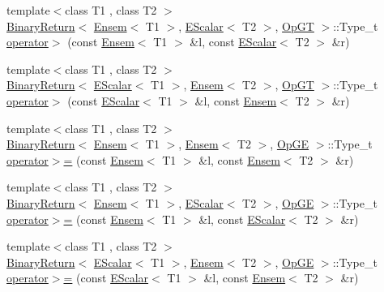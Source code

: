 \begin{DoxyCompactItemize}
\item 
{\footnotesize template$<$class T1 , class T2 $>$ }\\\mbox{\hyperlink{structENSEM_1_1BinaryReturn}{Binary\+Return}}$<$ \mbox{\hyperlink{classENSEM_1_1Ensem}{Ensem}}$<$ T1 $>$, \mbox{\hyperlink{classENSEM_1_1EScalar}{E\+Scalar}}$<$ T2 $>$, \mbox{\hyperlink{structENSEM_1_1OpGT}{Op\+GT}} $>$\+::Type\+\_\+t \mbox{\hyperlink{group__eensem_gadb5372b36c1e21728de4e36358b59440}{operator$>$}} (const \mbox{\hyperlink{classENSEM_1_1Ensem}{Ensem}}$<$ T1 $>$ \&l, const \mbox{\hyperlink{classENSEM_1_1EScalar}{E\+Scalar}}$<$ T2 $>$ \&r)
\item 
{\footnotesize template$<$class T1 , class T2 $>$ }\\\mbox{\hyperlink{structENSEM_1_1BinaryReturn}{Binary\+Return}}$<$ \mbox{\hyperlink{classENSEM_1_1EScalar}{E\+Scalar}}$<$ T1 $>$, \mbox{\hyperlink{classENSEM_1_1Ensem}{Ensem}}$<$ T2 $>$, \mbox{\hyperlink{structENSEM_1_1OpGT}{Op\+GT}} $>$\+::Type\+\_\+t \mbox{\hyperlink{group__eensem_gaf81a55e62404e9b802fbb90aaee678ea}{operator$>$}} (const \mbox{\hyperlink{classENSEM_1_1EScalar}{E\+Scalar}}$<$ T1 $>$ \&l, const \mbox{\hyperlink{classENSEM_1_1Ensem}{Ensem}}$<$ T2 $>$ \&r)
\item 
{\footnotesize template$<$class T1 , class T2 $>$ }\\\mbox{\hyperlink{structENSEM_1_1BinaryReturn}{Binary\+Return}}$<$ \mbox{\hyperlink{classENSEM_1_1Ensem}{Ensem}}$<$ T1 $>$, \mbox{\hyperlink{classENSEM_1_1Ensem}{Ensem}}$<$ T2 $>$, \mbox{\hyperlink{structENSEM_1_1OpGE}{Op\+GE}} $>$\+::Type\+\_\+t \mbox{\hyperlink{group__eensem_gab4cf01cccb06cf4c911567c3ee6eb808}{operator$>$=}} (const \mbox{\hyperlink{classENSEM_1_1Ensem}{Ensem}}$<$ T1 $>$ \&l, const \mbox{\hyperlink{classENSEM_1_1Ensem}{Ensem}}$<$ T2 $>$ \&r)
\item 
{\footnotesize template$<$class T1 , class T2 $>$ }\\\mbox{\hyperlink{structENSEM_1_1BinaryReturn}{Binary\+Return}}$<$ \mbox{\hyperlink{classENSEM_1_1Ensem}{Ensem}}$<$ T1 $>$, \mbox{\hyperlink{classENSEM_1_1EScalar}{E\+Scalar}}$<$ T2 $>$, \mbox{\hyperlink{structENSEM_1_1OpGE}{Op\+GE}} $>$\+::Type\+\_\+t \mbox{\hyperlink{group__eensem_gaefcc523be9266958f63fc6b34c2671e8}{operator$>$=}} (const \mbox{\hyperlink{classENSEM_1_1Ensem}{Ensem}}$<$ T1 $>$ \&l, const \mbox{\hyperlink{classENSEM_1_1EScalar}{E\+Scalar}}$<$ T2 $>$ \&r)
\item 
{\footnotesize template$<$class T1 , class T2 $>$ }\\\mbox{\hyperlink{structENSEM_1_1BinaryReturn}{Binary\+Return}}$<$ \mbox{\hyperlink{classENSEM_1_1EScalar}{E\+Scalar}}$<$ T1 $>$, \mbox{\hyperlink{classENSEM_1_1Ensem}{Ensem}}$<$ T2 $>$, \mbox{\hyperlink{structENSEM_1_1OpGE}{Op\+GE}} $>$\+::Type\+\_\+t \mbox{\hyperlink{group__eensem_ga08b4c51fd25a40dd1d20e6138378a63d}{operator$>$=}} (const \mbox{\hyperlink{classENSEM_1_1EScalar}{E\+Scalar}}$<$ T1 $>$ \&l, const \mbox{\hyperlink{classENSEM_1_1Ensem}{Ensem}}$<$ T2 $>$ \&r)

\end{DoxyCompactItemize}
